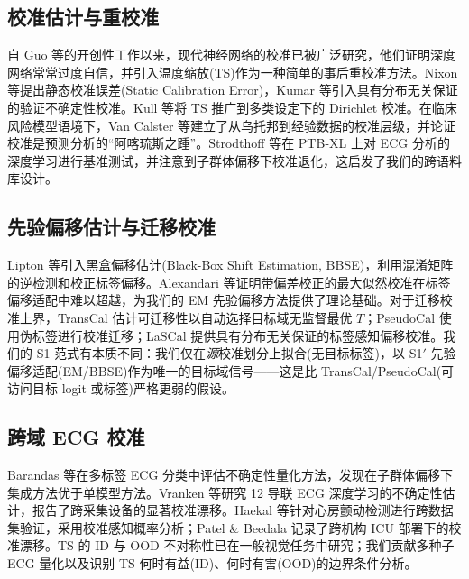 \subsection{校准估计与重校准}
自 Guo 等\cite{guo2017calibration}的开创性工作以来，现代神经网络的校准已被广泛研究，他们证明深度网络常常过度自信，并引入温度缩放(TS)作为一种简单的事后重校准方法。Nixon 等\cite{nixon2019}提出静态校准误差(Static Calibration Error)，Kumar 等\cite{kumar2019}引入具有分布无关保证的验证不确定性校准。Kull 等\cite{kull2019dirichlet}将 TS 推广到多类设定下的 Dirichlet 校准。在临床风险模型语境下，Van Calster 等\cite{vancalster2016,vancalster2019}建立了从乌托邦到经验数据的校准层级，并论证校准是预测分析的``阿喀琉斯之踵''。Strodthoff 等\cite{strodthoff2021}在 PTB-XL 上对 ECG 分析的深度学习进行基准测试，并注意到子群体偏移下校准退化，这启发了我们的跨语料库设计。

\subsection{先验偏移估计与迁移校准}
Lipton 等\cite{lipton2018bbs}引入黑盒偏移估计(Black-Box Shift Estimation, BBSE)，利用混淆矩阵的逆检测和校正标签偏移。Alexandari 等\cite{alexandari2020}证明带偏差校正的最大似然校准在标签偏移适配中难以超越，为我们的 EM 先验偏移方法提供了理论基础。对于迁移校准上界，TransCal \cite{transcal2020}估计可迁移性以自动选择目标域无监督最优 $T$；PseudoCal \cite{pseudocal2020}使用伪标签进行校准迁移；LaSCal \cite{lascal2024}提供具有分布无关保证的标签感知偏移校准。我们的 S1 范式有本质不同：我们仅在\emph{源}校准划分上拟合(无目标标签)，以 S1$'$ 先验偏移适配(EM/BBSE)作为唯一的目标域信号——这是比 TransCal/PseudoCal(可访问目标 logit 或标签)严格更弱的假设。

\subsection{跨域 ECG 校准}
Barandas 等\cite{barandas2023}在多标签 ECG 分类中评估不确定性量化方法，发现在子群体偏移下集成方法优于单模型方法。Vranken 等\cite{zhang2022}研究 12 导联 ECG 深度学习的不确定性估计，报告了跨采集设备的显著校准漂移。Haekal 等\cite{physiolmeas2026}针对心房颤动检测进行跨数据集验证，采用校准感知概率分析；Patel \& Beedala \cite{medrxiv2026}记录了跨机构 ICU 部署下的校准漂移。TS 的 ID 与 OOD 不对称性已在一般视觉任务中研究\cite{ovadia2019calibration}；我们贡献多种子 ECG 量化以及识别 TS 何时有益(ID)、何时有害(OOD)的边界条件分析。

